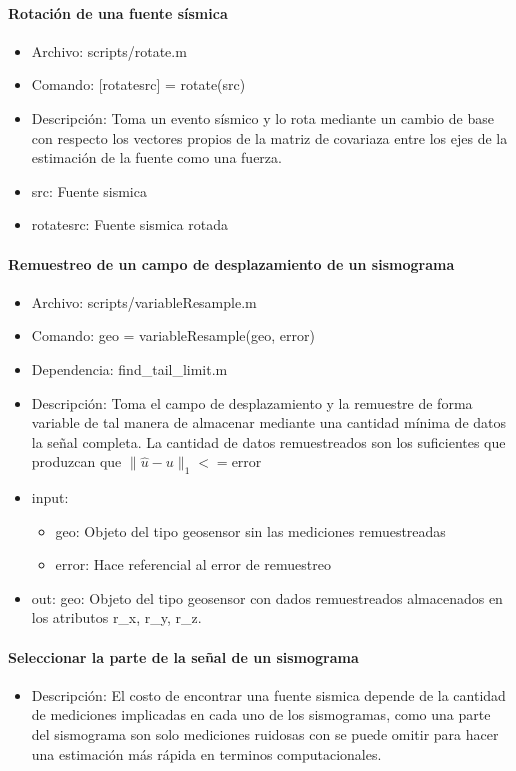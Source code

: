 \paragraph{Rotación de una fuente sísmica}
\begin{itemize}
  \item Archivo: scripts/rotate.m
  \item Comando: [rotatesrc] = rotate(src)
  \item Descripción: Toma un evento sísmico y lo rota mediante un cambio de base
  con respecto los vectores propios de la matriz de covariaza entre los ejes de
  la estimación de la fuente como una fuerza.
  \item src: Fuente sismica
  \item rotatesrc: Fuente sismica rotada
\end{itemize}


\paragraph{Remuestreo de un campo de desplazamiento de un sismograma}
\begin{itemize}
  \item Archivo: scripts/variableResample.m
  \item Comando: geo = variableResample(geo, error)
  \item Dependencia: find\_tail\_limit.m
  \item Descripción: Toma el campo de desplazamiento y la remuestre de forma
  variable de tal manera de almacenar mediante una cantidad mínima de datos la
  señal completa. La cantidad de datos remuestreados son los suficientes que
  produzcan que $\|\hat{u} - u\|_1<=\text{error}$
  \item input:
  \begin{itemize}
    \item geo: Objeto del tipo geosensor sin las mediciones remuestreadas
    \item error: Hace referencial al error de remuestreo
  \end{itemize}
  \item out: geo: Objeto del tipo geosensor con dados remuestreados almacenados
  en los atributos r\_x, r\_y, r\_z.
\end{itemize}

\paragraph{Seleccionar la parte de la señal de un sismograma}
\begin{itemize}
  \item Descripción: El costo de encontrar una fuente sismica depende de la
  cantidad de mediciones implicadas en cada uno de los sismogramas, como una
  parte del sismograma son solo mediciones ruidosas con se puede omitir para
  hacer una estimación más rápida en terminos computacionales.
\end{itemize}
